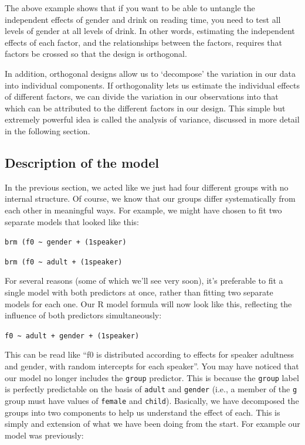\documentclass[
]{book}
\begin{document}
The above example shows that if you want to be able to untangle the independent effects of gender and drink on reading time, you need to test all levels of gender at all levels of drink. In other words, estimating the independent effects of each factor, and the relationships between the factors, requires that factors be crossed so that the design is orthogonal.

In addition, orthogonal designs allow us to `decompose' the variation in our data into individual components. If orthogonality lets us estimate the individual effects of different factors, we can divide the variation in our observations into that which can be attributed to the different factors in our design. This simple but extremely powerful idea is called the analysis of variance, discussed in more detail in the following section.

\hypertarget{description-of-the-model-3}{%
\subsection{Description of the model}\label{description-of-the-model-3}}

In the previous section, we acted like we just had four different groups with no internal structure. Of course, we know that our groups differ systematically from each other in meaningful ways. For example, we might have chosen to fit two separate models that looked like this:

\texttt{brm\ (f0\ \textasciitilde{}\ gender\ +\ (1\textbar{}speaker)}

\texttt{brm\ (f0\ \textasciitilde{}\ adult\ +\ (1\textbar{}speaker)}

For several reasons (some of which we'll see very soon), it's preferable to fit a single model with both predictors at once, rather than fitting two separate models for each one. Our R model formula will now look like this, reflecting the influence of both predictors simultaneously:

\texttt{f0\ \textasciitilde{}\ adult\ +\ gender\ +\ (1\textbar{}speaker)}

This can be read like ``f0 is distributed according to effects for speaker adultness and gender, with random intercepts for each speaker''. You may have noticed that our model no longer includes the \texttt{group} predictor. This is because the \texttt{group} label is perfectly predictable on the basis of \texttt{adult} and \texttt{gender} (i.e., a member of the \texttt{g} group must have values of \texttt{female} and \texttt{child}). Basically, we have decomposed the groups into two components to help us understand the effect of each. This is simply and extension of what we have been doing from the start. For example our model was previously:
\end{document}
